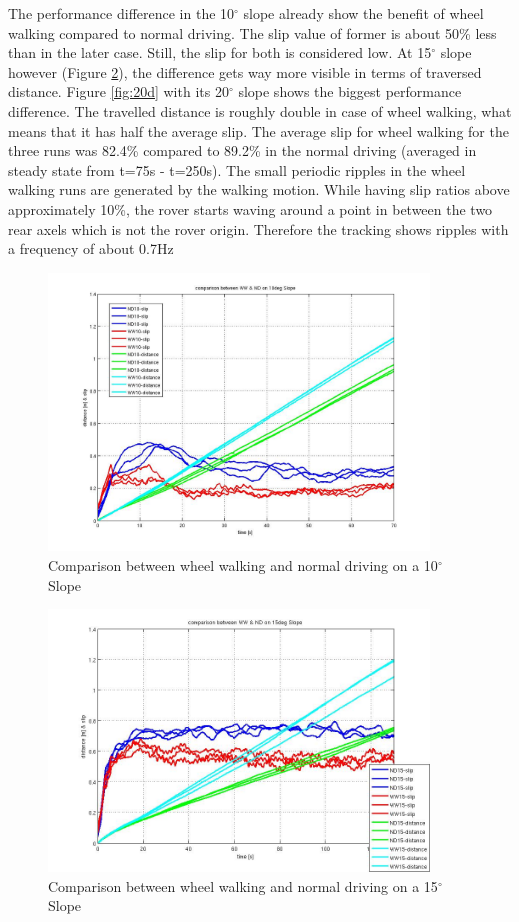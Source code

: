 \documentclass[a4paper,twocolumn]{esapub2005} %
\begin{document}
The performance difference in the 10$^\circ$ slope already show the benefit of wheel walking compared to normal driving. The slip value of former is about 50\% less than in the later case. Still, the slip for both is considered low.
At 15$^\circ$ slope however (Figure \ref{fig:15d}), the difference gets way more visible in terms of traversed distance. 
Figure \ref{fig:20d} with its 20$^\circ$ slope shows the biggest performance difference. The travelled distance is roughly double in case of wheel walking, what means that it has half the average slip. The average slip for wheel walking for the three runs was 82.4\% compared to 89.2\% in the normal driving (averaged in steady state from t=75s - t=250s). 
The small periodic ripples in the wheel walking runs are generated by the walking motion. While having slip ratios above approximately 10\%, the rover starts waving around a point in between the two rear axels which is not the rover origin. Therefore the tracking shows ripples with a frequency of about 0.7Hz

\begin{figure}[h!]
	\centering		\includegraphics[width=0.9\textwidth]{10d.JPG}	
	\caption{Comparison between wheel walking and normal driving on a 10$^{\circ}$ Slope}
	\label{fig:10d}
\end{figure}

\begin{figure}[h!]
	\centering		\includegraphics[width=0.9\textwidth]{15d.JPG}	
	\caption{Comparison between wheel walking and normal driving on a 15$^{\circ}$ Slope}
	\label{fig:15d}
\end{figure}
\end{document}

